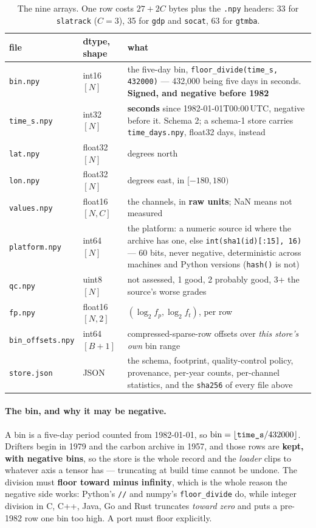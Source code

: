 \documentclass[10pt]{article}
\newcommand{\code}[1]{\texttt{#1}}
\begin{document}
\begin{table}[h]
\centering\setlength{\tabcolsep}{5pt}\footnotesize
\begin{tabular}{@{}l>{\raggedright\arraybackslash}p{2.5cm}>{\raggedright\arraybackslash}p{10.0cm}@{}}
\toprule
file & dtype, shape & what \\
\midrule
\code{bin.npy} & int16 $[N]$ & the five-day bin, \code{floor\_divide(time\_s, 432000)} --- 432,000 being five days in seconds. \textbf{Signed, and negative before 1982} \\
\code{time\_s.npy} & int32 $[N]$ & \textbf{seconds} since 1982-01-01T00:00\,UTC, negative before it. Schema 2; a schema-1 store carries \code{time\_days.npy}, float32 days, instead \\
\code{lat.npy} & float32 $[N]$ & degrees north \\
\code{lon.npy} & float32 $[N]$ & degrees east, in $[-180, 180)$ \\
\code{values.npy} & float16 $[N, C]$ & the channels, in \textbf{raw units}; NaN means not measured \\
\code{platform.npy} & int64 $[N]$ & the platform: a numeric source id where the archive has one, else \code{int(sha1(id)[:15], 16)} --- 60 bits, never negative, deterministic across machines and Python versions (\code{hash()} is not) \\
\code{qc.npy} & uint8 $[N]$ & 0 not assessed, 1 good, 2 probably good, 3+ the source's worse grades \\
\code{fp.npy} & float16 $[N, 2]$ & $(\log_2 f_p, \log_2 f_t)$, per row \\
\code{bin\_offsets.npy} & int64 $[B+1]$ & compressed-sparse-row offsets over \emph{this store's own} bin range \\
\code{store.json} & JSON & the schema, footprint, quality-control policy, provenance, per-year counts, per-channel statistics, and the \code{sha256} of every file above \\
\bottomrule
\end{tabular}
\caption{The nine arrays. One row costs $27 + 2C$ bytes plus the \code{.npy}
headers: 33 for \code{slatrack} ($C = 3$), 35 for \code{gdp} and \code{socat},
63 for \code{gtmba}.}
\end{table}

\paragraph{The bin, and why it may be negative.} A bin is a five-day period
counted from 1982-01-01, so
$\mathrm{bin} = \lfloor \text{\code{time\_s}} / 432000 \rfloor$. Drifters begin
in 1979 and the carbon archive in 1957, and those rows are \textbf{kept, with
negative bins}, so the store is the whole record and the \emph{loader} clips to
whatever axis a tensor has --- truncating at build time cannot be undone. The
division must \textbf{floor toward minus infinity}, which is the whole reason
the negative side works: Python's \code{//} and numpy's \code{floor\_divide} do,
while integer division in C, C++, Java, Go and Rust truncates \emph{toward
zero} and puts a pre-1982 row one bin too high. A port must floor explicitly.
\end{document}

